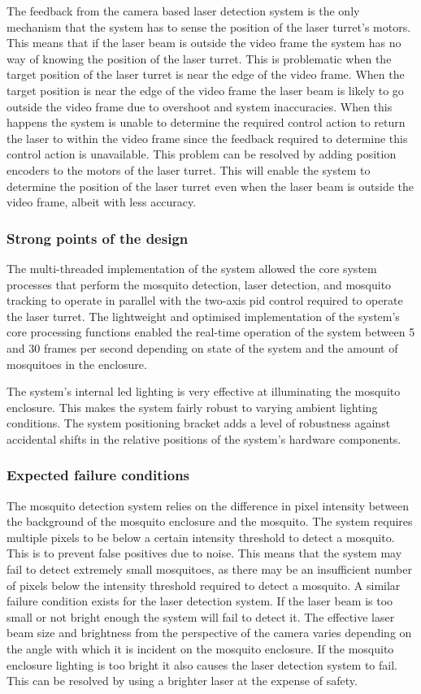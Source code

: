 The feedback from the camera based laser detection system is the only mechanism that the system has to sense the position of the laser turret's motors. This means that if the laser beam is outside the video frame the system has no way of knowing the position of the laser turret. This is problematic when the target position of the laser turret is near the edge of the video frame. When the target position is near the edge of the video frame the laser beam is likely to go outside the video frame due to overshoot and system inaccuracies. When this happens the system is unable to determine the required control action to return the laser to within the video frame since the feedback required to determine this control action is unavailable. This problem can be resolved by adding position encoders to the motors of the laser turret. This will enable the system to determine the position of the laser turret even when the laser beam is outside the video frame, albeit with less accuracy.


\subsubsection{Strong points of the design}
The multi-threaded implementation of the system allowed the core system processes that perform the mosquito detection, laser detection, and mosquito tracking to operate in parallel with the two-axis \gls{pid} control required to operate the laser turret. The lightweight and optimised implementation of the system's core processing functions enabled the real-time operation of the system between 5 and 30 frames per second depending on state of the system and the amount of mosquitoes in the enclosure.

The system's internal \gls{led} lighting is very effective at illuminating the mosquito enclosure. This makes the system fairly robust to varying ambient lighting conditions. The system positioning bracket adds a level of robustness against accidental shifts in the relative positions of the system's hardware components.

\subsubsection{Expected failure conditions}
The mosquito detection system relies on the difference in pixel intensity between the background of the mosquito enclosure and the mosquito. The system requires multiple pixels to be below a certain intensity threshold to detect a mosquito. This is to prevent false positives due to noise. This means that the system may fail to detect extremely small mosquitoes, as there may be an insufficient number of pixels below the intensity threshold required to detect a mosquito. A similar failure condition exists for the laser detection system. If the laser beam is too small or not bright enough the system will fail to detect it. The effective laser beam size and brightness from the perspective of the camera varies depending on the angle with which it is incident on the mosquito enclosure. If the mosquito enclosure lighting is too bright it also causes the laser detection system to fail. This can be resolved by using a brighter laser at the expense of safety.

